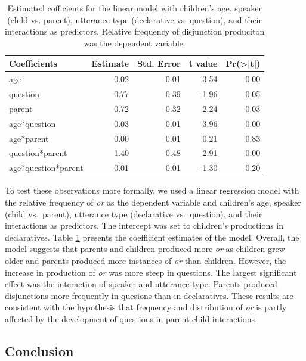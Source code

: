 \documentclass[,man,floatsintext]{apa6}
\begin{document}
\begin{table}

\caption{\label{tab:study1coeftable}Estimated cofficients for the linear model with children's age, speaker (child vs. parent), utterance type (declarative vs. question), and their interactions as predictors. Relative frequency of disjunction produciton was the dependent variable.}
\centering
\fontsize{9}{11}\selectfont
\begin{tabular}[t]{l|r|r|r|r}
\hline
Coefficients & Estimate & Std. Error & t value & Pr(>|t|)\\
\hline
age & 0.02 & 0.01 & 3.54 & 0.00\\
\hline
question & -0.77 & 0.39 & -1.96 & 0.05\\
\hline
parent & 0.72 & 0.32 & 2.24 & 0.03\\
\hline
age*question & 0.03 & 0.01 & 3.96 & 0.00\\
\hline
age*parent & 0.00 & 0.01 & 0.21 & 0.83\\
\hline
question*parent & 1.40 & 0.48 & 2.91 & 0.00\\
\hline
age*question*parent & -0.01 & 0.01 & -1.30 & 0.20\\
\hline
\end{tabular}
\end{table}

To test these observations more formally, we used a linear regression model with the relative frequency of \emph{or} as the dependent variable and children's age, speaker (child vs.~parent), utterance type (declarative vs.~question), and their interactions as predictors. The intercept was set to children's productions in declaratives. Table \ref{tab:study1coeftable} presents the coefficient estimates of the model. Overall, the model suggests that parents and children produced more \emph{or} as children grew older and parents produced more instances of \emph{or} than children. However, the increase in production of \emph{or} was more steep in questions. The largest significant effect was the interaction of speaker and utterance type. Parents produced disjunctions more frequently in quesions than in declaratives. These results are consistent with the hypothesis that frequency and distribution of \emph{or} is partly affected by the development of questions in parent-child interactions.

\hypertarget{study1discussion}{%
\subsection{Conclusion}\label{study1discussion}}
\end{document}
